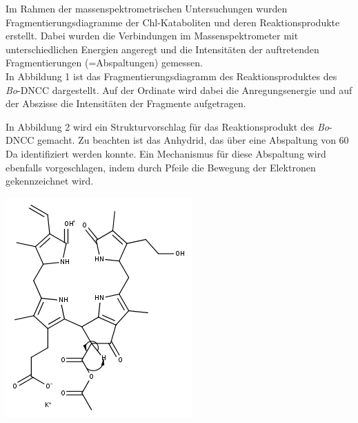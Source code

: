 \documentclass[landscape,a0paper,fontscale=0.285]{baposter} %
\begin{document}
\begin{poster}
{\begin{multicols}{2}
Im Rahmen der massenspektrometrischen Untersuchungen wurden Fragmentierungsdiagramme der Chl-Kataboliten und deren Reaktionsprodukte erstellt. Dabei wurden die Verbindungen im Massenspektrometer mit unterschiedlichen Energien angeregt und die Intensitäten der auftretenden Fragmentierungen (=Abspaltungen) gemessen. \\

In Abbildung 1 ist das Fragmentierungsdiagramm des Reaktionsproduktes des \textit{Bo}-DNCC dargestellt. Auf der Ordinate wird dabei die Anregungsenergie und auf der Abszisse die Intensitäten der Fragmente aufgetragen. 
\end{multicols}


\begin{multicols}{2}
\vspace{1em}
In Abbildung 2 wird ein Strukturvorschlag für das Reaktionsprodukt des \textit{Bo}-DNCC gemacht. Zu beachten ist das Anhydrid, das über eine Abspaltung von 60 Da identifiziert werden konnte. Ein Mechanismus für diese Abspaltung wird ebenfalls vorgeschlagen, indem durch Pfeile die Bewegung der Elektronen gekennzeichnet wird.  

\begin{center}
\includegraphics[width=0.8\linewidth, height=0.3\textheight]{VWA_Katabolit_699-639_MK_electronMovement}
\end{center}


\end{multicols}}
\end{poster}
\end{document}
